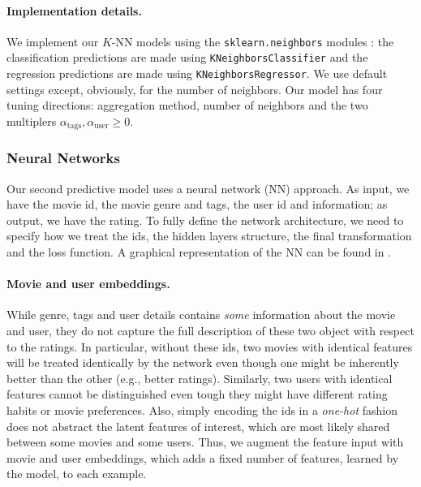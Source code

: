 \documentclass[bj, preprint]{imsart}
\begin{document}
\paragraph{Implementation details.}\label{par:method.models.knn.impl}

We implement our $K$-NN models using the \texttt{sklearn.neighbors} modules \citep{scikit-learn}: the classification predictions are made using \texttt{KNeighborsClassifier} and the regression predictions are made using \texttt{KNeighborsRegressor}. We use default settings except, obviously, for the number of neighbors. Our model has four tuning directions: aggregation method, number of neighbors and the two multiplers $\alpha_\text{tags},\alpha_\text{user}\geqslant 0$.

\subsubsection{Neural Networks}\label{subsubsec:method.models.nn}

Our second predictive model uses a neural network (NN) approach. As input, we have the movie id, the movie genre and tags, the user id and information; as output, we have the rating. 
To fully define the network architecture, we need to specify how we treat the ids, the hidden layers structure, the final transformation and the loss function. 
A graphical representation of the NN can be found in .

\paragraph{Movie and user embeddings.}\label{par:method.models.nn.embed}

While genre, tags and user details contains \textit{some} information about the movie and user, they do not capture the full description of these two object with respect to the ratings. 
In particular, without these ids, two movies with identical features will be treated identically by the network even though one might be inherently better than the other (e.g., better ratings).
Similarly, two users with identical features cannot be distinguished even tough they might have different rating habits or movie preferences.
Also, simply encoding the ids in a \textit{one-hot} fashion does not abstract the latent features of interest, which are most likely shared between some movies and some users. 
Thus, we augment the feature input with movie and user embeddings, which adds a fixed number of features, learned by the model, to each example. 
\end{document}
